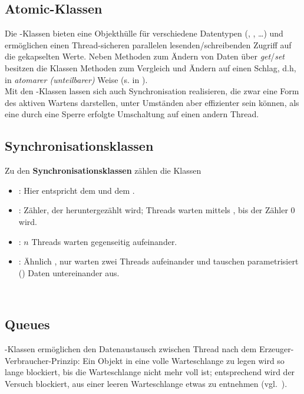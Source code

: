 \subsection*{Atomic-Klassen}
Die -Klassen bieten eine Objekthülle für verschiedene Datentypen (, , \ldots) und ermöglichen einen Thread-sicheren parallelen lesenden/schreibenden Zugriff auf die gekapselten Werte.
Neben Methoden zum Ändern von Daten über \textit{get}/\textit{set} besitzen die Klassen Methoden zum Vergleich und Ändern auf einen Schlag, d.h, in \textit{atomarer (unteilbarer)} Weise (s.  in \cite[157]{Oec22}).\\

\noindent
Mit den -Klassen lassen sich auch  Synchronisation realisieren, die zwar eine Form des aktiven Wartens darstellen, unter Umständen aber effizienter sein können, als eine durch eine Sperre erfolgte Umschaltung auf einen andern Thread.\\

\subsection*{Synchronisationsklassen}
Zu den \textbf{Synchronisationsklassen} zählen die Klassen
\begin{itemize}
    \item {}: Hier entspricht  dem  und  dem .
    \item {}: Zähler, der heruntergezählt wird; Threads warten mittels , bis der Zähler $0$ wird.
    \item {}: $n$ Threads warten gegenseitig aufeinander.
    \item {}: Ähnlich , nur warten zwei Threads aufeinander und tauschen parametrisiert () Daten untereinander aus.
\end{itemize}\\

\subsection*{Queues}
-Klassen ermöglichen den  Datenaustausch zwischen Thread nach dem Erzeuger-Verbraucher-Prinzip: Ein Objekt in eine volle Warteschlange zu legen wird so lange blockiert, bis die Warteschlange nicht mehr voll ist; entsprechend wird der Versuch blockiert, aus einer leeren Warteschlange etwas zu entnehmen (vgl.~\cite[164]{Oec22}).

